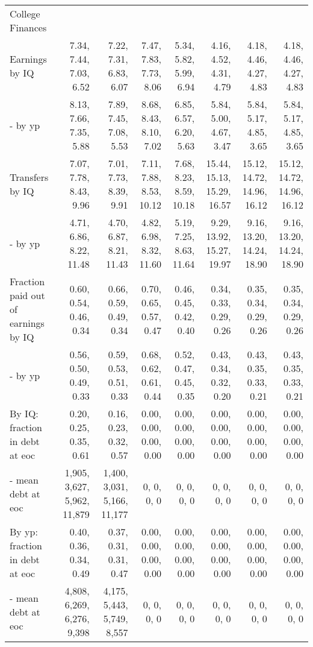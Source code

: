 \begin{tabular}{lrrrrrrr}
\hline
College Finances &   &   &   &   &   &   &   \\ 
Earnings by IQ & 7.34, 7.44, 7.03, 6.52  & 7.22, 7.31, 6.83, 6.07  & 7.47, 7.83, 7.73, 8.06  & 5.34, 5.82, 5.99, 6.94  & 4.16, 4.52, 4.31, 4.79  & 4.18, 4.46, 4.27, 4.83  & 4.18, 4.46, 4.27, 4.83  \\ 
- by yp & 8.13, 7.66, 7.35, 5.88  & 7.89, 7.45, 7.08, 5.53  & 8.68, 8.43, 8.10, 7.02  & 6.85, 6.57, 6.20, 5.63  & 5.84, 5.00, 4.67, 3.47  & 5.84, 5.17, 4.85, 3.65  & 5.84, 5.17, 4.85, 3.65  \\ 
Transfers by IQ & 7.07, 7.78, 8.43, 9.96  & 7.01, 7.73, 8.39, 9.91  & 7.11, 7.88, 8.53, 10.12  & 7.68, 8.23, 8.59, 10.18  & 15.44, 15.13, 15.29, 16.57  & 15.12, 14.72, 14.96, 16.12  & 15.12, 14.72, 14.96, 16.12  \\ 
- by yp & 4.71, 6.86, 8.22, 11.48  & 4.70, 6.87, 8.21, 11.43  & 4.82, 6.98, 8.32, 11.60  & 5.19, 7.25, 8.63, 11.64  & 9.29, 13.92, 15.27, 19.97  & 9.16, 13.20, 14.24, 18.90  & 9.16, 13.20, 14.24, 18.90  \\ 
Fraction paid out of earnings by IQ & 0.60, 0.54, 0.46, 0.34  & 0.66, 0.59, 0.49, 0.34  & 0.70, 0.65, 0.57, 0.47  & 0.46, 0.45, 0.42, 0.40  & 0.34, 0.33, 0.29, 0.26  & 0.35, 0.34, 0.29, 0.26  & 0.35, 0.34, 0.29, 0.26  \\ 
- by yp & 0.56, 0.50, 0.49, 0.33  & 0.59, 0.53, 0.51, 0.33  & 0.68, 0.62, 0.61, 0.44  & 0.52, 0.47, 0.45, 0.35  & 0.43, 0.34, 0.32, 0.20  & 0.43, 0.35, 0.33, 0.21  & 0.43, 0.35, 0.33, 0.21  \\ 
By IQ: fraction in debt at eoc & 0.20, 0.25, 0.35, 0.61  & 0.16, 0.23, 0.32, 0.57  & 0.00, 0.00, 0.00, 0.00  & 0.00, 0.00, 0.00, 0.00  & 0.00, 0.00, 0.00, 0.00  & 0.00, 0.00, 0.00, 0.00  & 0.00, 0.00, 0.00, 0.00  \\ 
- mean debt at eoc & 1,905, 3,627, 5,962, 11,879  & 1,400, 3,031, 5,166, 11,177  & 0, 0, 0, 0  & 0, 0, 0, 0  & 0, 0, 0, 0  & 0, 0, 0, 0  & 0, 0, 0, 0  \\ 
By yp: fraction in debt at eoc & 0.40, 0.36, 0.34, 0.49  & 0.37, 0.31, 0.31, 0.47  & 0.00, 0.00, 0.00, 0.00  & 0.00, 0.00, 0.00, 0.00  & 0.00, 0.00, 0.00, 0.00  & 0.00, 0.00, 0.00, 0.00  & 0.00, 0.00, 0.00, 0.00  \\ 
- mean debt at eoc & 4,808, 6,269, 6,276, 9,398  & 4,175, 5,443, 5,749, 8,557  & 0, 0, 0, 0  & 0, 0, 0, 0  & 0, 0, 0, 0  & 0, 0, 0, 0  & 0, 0, 0, 0  \\ 
\hline
\end{tabular}%
